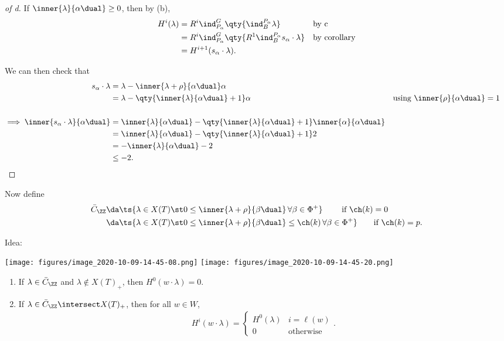 \begin{proof}[of d]

If \(\inner{\lambda}{\alpha\dual} \geq 0\), then by (b),
\begin{align*}  
H^i(\lambda) 
&= R^i \ind_{P_\alpha}^G \qty{ \ind_B^{P_\alpha} \lambda } && \text{by c}\\
&= R^i \ind_{P_\alpha}^G \qty{ R^1 \ind_B^{P_\alpha} s_\alpha\cdot \lambda } && \text{by corollary}\\
&= H^{i+1}(s_\alpha\cdot \lambda)
.\end{align*}

We can then check that
\begin{align*}  
s_\alpha \cdot \lambda
&= \lambda - \inner{\lambda + \rho}{\alpha\dual}\alpha \\
&= \lambda - \qty{ \inner{\lambda}{\alpha\dual} + 1 }\alpha && \text{using } \inner{\rho}{\alpha\dual} = 1 \\ \\
\implies 
\inner{s_\alpha \cdot \lambda}{\alpha\dual}
&= \inner{\lambda}{\alpha\dual} - \qty{ \inner{\lambda}{\alpha\dual}+1 }\inner{\alpha}{\alpha\dual} \\
&= \inner{\lambda}{\alpha\dual} - \qty{ \inner{\lambda}{\alpha\dual}+1 }2 \\
&= -\inner{\lambda}{\alpha\dual} - 2 \\
&\leq -2
.\end{align*}

\end{proof}

Now define
\begin{align*}  
\bar{C}_{\ZZ} 
&\da 
\ts{
\lambda \in X(T) \st 0 \leq \inner{\lambda+\rho}{\beta\dual} \,\forall \beta \in \Phi^+
} \qquad\text{ if } \ch(k) = 0 \\
&\da
\ts{
\lambda \in X(T) \st 0 \leq \inner{\lambda+\rho}{\beta\dual} \leq \ch(k) \,\forall \beta \in \Phi^+
} \qquad\text{if } \ch(k) = p
.\end{align*}

Idea:

\texttt{[image: figures/image\_2020-10-09-14-45-08.png]}
\texttt{[image: figures/image\_2020-10-09-14-45-20.png]}

\begin{theorem}

\begin{enumerate}
\def\labelenumi{\alph{enumi}.}
\item
  If \(\lambda \in \bar{C}_\ZZ\) and \(\lambda \not\in X(T)_+\), then
  \(H^0(w\cdot \lambda) = 0\).
\item
  If \(\lambda \in \bar{C}_\ZZ \intersect X(T)_+\), then for all
  \(w\in W\),
  \begin{align*}  
  H^i(w\cdot \lambda) = 
  \begin{cases}
  H^0(\lambda) & i= \ell(w) \\
  0 & \text{otherwise}
  \end{cases}
  .\end{align*}
\end{enumerate}

\end{theorem}

